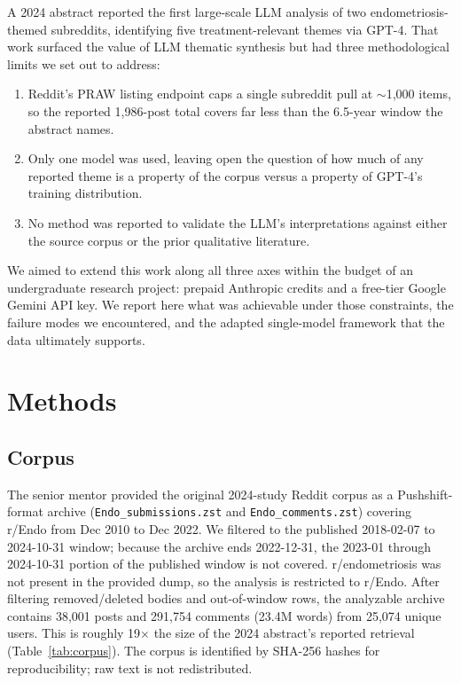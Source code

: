 \documentclass[11pt]{article}
\begin{document}
A 2024 abstract reported the first large-scale LLM analysis of two
endometriosis-themed subreddits, identifying five treatment-relevant
themes via GPT-4. That work surfaced the value of LLM thematic synthesis
but had three methodological limits we set out to address:

\begin{enumerate}
  \item Reddit's PRAW listing endpoint caps a single subreddit pull at
    $\sim$1{,}000 items, so the reported 1{,}986-post total covers far
    less than the 6.5-year window the abstract names.
  \item Only one model was used, leaving open the question of how much
    of any reported theme is a property of the corpus versus a property
    of GPT-4's training distribution.
  \item No method was reported to validate the LLM's interpretations
    against either the source corpus or the prior qualitative
    literature.
\end{enumerate}

We aimed to extend this work along all three axes within the budget of
an undergraduate research project: prepaid Anthropic credits and a
free-tier Google Gemini API key. We report here what was achievable
under those constraints, the failure modes we encountered, and the
adapted single-model framework that the data ultimately supports.

\section{Methods}

\subsection{Corpus}

The senior mentor provided the original 2024-study Reddit corpus as a
Pushshift-format archive (\texttt{Endo\_submissions.zst} and
\texttt{Endo\_comments.zst}) covering r/Endo from Dec 2010 to Dec
2022. We filtered to the published 2018-02-07 to 2024-10-31 window;
because the archive ends 2022-12-31, the 2023-01 through 2024-10-31
portion of the published window is not covered. r/endometriosis was
not present in the provided dump, so the analysis is restricted to
r/Endo. After filtering removed/deleted bodies and out-of-window
rows, the analyzable archive contains 38{,}001 posts and 291{,}754
comments (23.4M words) from 25{,}074 unique users. This is roughly
19$\times$ the size of the 2024 abstract's reported retrieval
(Table~\ref{tab:corpus}). The corpus is identified by SHA-256 hashes
for reproducibility; raw text is not redistributed.
\end{document}
